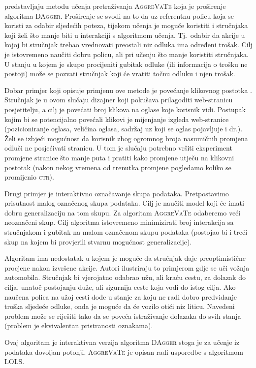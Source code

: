\citet{ross2011reduction} predstavljaju metodu učenja pretraživanja
\textsc{AggreVaTe}  koja je
proširenje algoritma \textsc{DAgger}. Proširenje se svodi na to da uz referentnu
policu koja se koristi za odabir sljedećih poteza, tijekom učenja je moguće
koristiti i stručnjaka koji želi što manje biti u interakciji s algoritmom
učenja. Tj.~odabir da akcije u kojoj bi stručnjak trebao vrednovati preostali
niz odluka ima određeni trošak. Cilj je istovremeno naučiti dobru policu, ali
pri učenju što manje koristiti stručnjaka. U stanju u kojem je skupo procijeniti
gubitak odluke (ili informacija o trošku ne postoji) može se pozvati stručnjak
koji će vratiti točnu odluku i njen trošak.

Dobar primjer koji opisuje primjenu ove metode je povećanje klikovnog postotka
. Stručnjak je u ovom slučaju dizajner koji
pokušava prilagoditi web-stranicu posjetitelju, a cilj je povećati broj klikova
na oglase koje korisnik vidi. Postupak kojim bi se potencijalno povećali klikovi
je mijenjanje izgleda web-stranice (pozicioniranje oglasa, veličina oglasa,
sadržaj uz koji se oglas pojavljuje i dr.). Želi se izbjeći mogućnost da
korisnik zbog ogromnog broja nasumičnih promjena odluči ne posjećivati stranicu.
U tom je slučaju potrebno vršiti eksperiment promjene stranice što manje puta i
pratiti kako promjene utječu na klikovni postotak (nakon nekog vremena od
trenutka promjene pogledamo koliko se promijenio \textsc{ctr}).

Drugi primjer je interaktivno označavanje skupa podataka. Pretpostavimo
prisutnost malog označenog skupa podataka. Cilj je naučiti model koji će imati
dobru generalizaciju na tom skupu. Za algoritam \textsc{AggreVaTe} odaberemo
veći neoznačeni skup. Cilj algoritma istovremeno minimizirati broj interakcija
sa stručnjakom i gubitak na malom označenom skupu podataka (postojao bi i treći
skup na kojem bi provjerili stvarnu mogućnost generalizacije).

Algoritam ima nedostatak u kojem je moguće da stručnjak daje preoptimistične
procjene nakon izvršene akcije. Autori ilustriraju to primjerom gdje se uči
vožnja automobila. Stručnjak bi vjerojatno odabrao užu, ali kraću cestu, za
dolazak do cilja, unatoč postojanju duže, ali sigurnija ceste koja vodi do istog
cilja. Ako naučena polica na užoj cesti dođe u stanje za koju ne radi dobro
predviđanje troška sljedeće odluke, onda je moguće da će vozilo otići niz
liticu. Navedeni problem može se riješiti tako da se poveća istraživanje
dolazaka do svih stanja (problem je ekvivalentan pristranosti oznakama).

Ovaj algoritam je interaktivna verzija algoritma \textsc{DAgger} stoga je za
učenje iz podataka dovoljan potonji. \textsc{AggreVaTe} je opisan radi usporedbe
s algoritmom \textsc{LOLS}.
